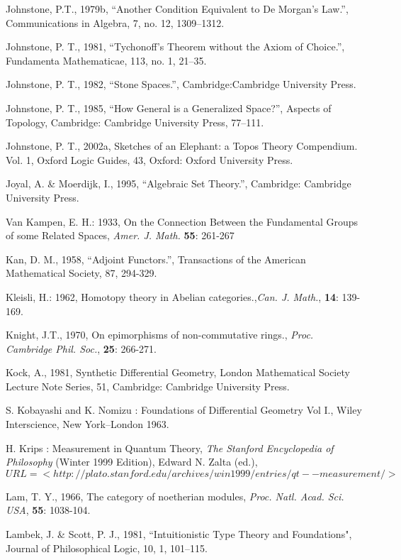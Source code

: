 \documentclass[12pt]{article}
\begin{document}
\begin{thebibliography}{399}
Johnstone, P.T., 1979b, ``Another Condition Equivalent to De Morgan's Law.'', Communications in Algebra, 7, no. 12, 1309--1312.  

Johnstone, P. T., 1981, ``Tychonoff's Theorem without the Axiom of Choice.'', Fundamenta Mathematicae, 113, no. 1, 21--35. 

Johnstone, P. T., 1982, ``Stone Spaces.'', Cambridge:Cambridge University Press.  

Johnstone, P. T., 1985, ``How General is a Generalized Space?'', Aspects of Topology, Cambridge: Cambridge University Press, 77--111. 

Johnstone, P. T., 2002a, Sketches of an Elephant: a Topos Theory Compendium. Vol. 1, Oxford Logic Guides, 43, Oxford: Oxford University Press.  

Joyal, A. \& Moerdijk, I., 1995, ``Algebraic Set Theory.'', Cambridge: Cambridge University Press.  

Van Kampen, E. H.: 1933, On the Connection Between the Fundamental
Groups of some Related Spaces, \emph{Amer. J. Math.} \textbf{55}: 261-267

Kan, D. M., 1958, ``Adjoint Functors.'', Transactions of the American Mathematical Society, 87, 294-329.  

Kleisli, H.: 1962, Homotopy theory in Abelian categories.,{\em Can. J. Math.}, \textbf{14}: 139-169.

Knight, J.T., 1970, On epimorphisms of non-commutative rings., {\em Proc. Cambridge Phil. Soc.},
\textbf{25}: 266-271.

Kock, A., 1981, Synthetic Differential Geometry, London Mathematical Society Lecture Note Series, 51, Cambridge: Cambridge University Press. 

S. Kobayashi and K. Nomizu : Foundations of Differential Geometry
Vol I., Wiley Interscience, New York--London 1963.

H. Krips : Measurement in Quantum Theory, \emph{The Stanford
Encyclopedia of Philosophy } ({Winter 1999 Edition}), Edward N.
Zalta (ed.), $URL=<http://plato.stanford.edu/archives/win1999/entries/qt--measurement/>$

Lam, T. Y., 1966, The category of noetherian modules, {\em Proc. Natl. Acad. Sci. USA}, \textbf{55}: 1038-104.

Lambek, J. \& Scott, P. J., 1981, ``Intuitionistic Type Theory and Foundations", Journal of Philosophical Logic, 10, 1, 101--115. 


\end{thebibliography}
\end{document}

